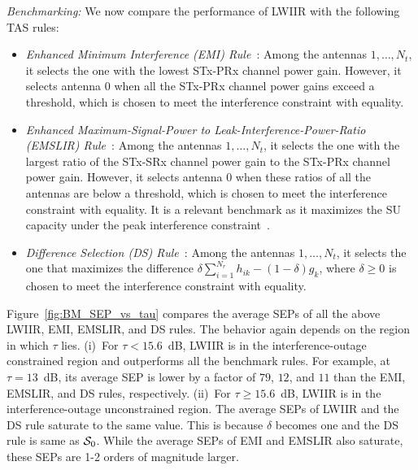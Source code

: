 \documentclass[12pt,draftcls,peerreview,onecolumn]{IEEEtran}
\newcommand{\Nt}{{N_t}}
\newcommand{\Nr}{{N_r}}
\newcommand{\such}{h}
\newcommand{\puch}{g}
\newcommand{\hk}[1]{{\such_{#1}}}
\newcommand{\gk}[1]{{\puch_{#1}}}
\newcommand{\itau}{\tau}
\newcommand{\caluncons}{{\cal S_{\text{0}}}}
\newcommand{\sumnr}{\sum_{i=1}^{\Nr}}
\begin{document}
{\em Benchmarking:} We now compare the performance of LWIIR with the following TAS rules:
\begin{itemize}
\item {\em Enhanced Minimum Interference (EMI) Rule~\cite{Sarvendranath_2013_TCOM}}: Among the antennas $1,\ldots,\Nt$, it selects the one with the lowest STx-PRx channel power gain. However, it selects antenna $0$ when all the STx-PRx channel power gains exceed a threshold, which is chosen to meet the interference constraint with equality. 

\item {\em Enhanced Maximum-Signal-Power to Leak-Interference-Power-Ratio (EMSLIR) Rule~\cite{Sarvendranath_2013_TCOM}}: Among the antennas $1,\ldots,\Nt$, it selects the one with the largest ratio of the STx-SRx channel power gain to the STx-PRx channel power gain. However, it selects antenna $0$ when these ratios of all the antennas are below a threshold, which is chosen to meet the interference constraint with equality. It is a relevant benchmark as it maximizes the SU capacity under the peak interference constraint~\cite{Wang_2010_TWC}. 

\item {\em Difference Selection (DS) Rule~\cite{Wang_2011_TCom,Sarvendranath_2014_TCOM}}: Among the antennas $1,\ldots,\Nt$, it selects the one that maximizes the difference $\delta \sumnr\hk{ik} -(1-\delta) \gk{k} $, where $\delta\geq 0$ is chosen to meet the interference constraint with equality.   

\end{itemize}


Figure~\ref{fig:BM_SEP_vs_tau} compares the average SEPs of all the above LWIIR, EMI, EMSLIR, and DS rules. The behavior again depends on the region in which $\itau$ lies. (i)~For $\itau < 15.6$~dB, LWIIR is in the interference-outage constrained region and outperforms all the benchmark rules. For example, at $\itau=13$~dB,  its average SEP is lower by a factor of $79$, $12$, and $11$ than the EMI, EMSLIR, and DS rules, respectively. (ii)~For $\itau \geq 15.6$~dB, LWIIR is in the interference-outage unconstrained region. The average SEPs of LWIIR and the DS rule saturate to the same value. This is because $\delta$ becomes one and the DS rule is same as $\caluncons$. While the average SEPs of EMI and EMSLIR also saturate, these SEPs are 1-2 orders of magnitude larger. 
\end{document}
